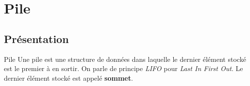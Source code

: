 \def\xxactivite{Cours}

\def\xxauteur{Emilien Durif -- Xavier Pessoles}
\fichefalse \proftrue \tdfalse \courstrue

\def\xxnumchapitre{Chapitre 9 \vspace{.2cm}}

\def\xxchapitre{Piles et files}

\def\xxcompetences{%
\textsl{%
\textbf{Savoirs et compétences :}\\
\begin{itemize}[label=\ding{112},font=\color{bleuxp}] 
\item Piles et files.
\end{itemize}
}}

\def\xxfigures{
}%



\setlength{\columnseprule}{.1pt}

\vspace{2cm}
\pagestyle{fancy}
\thispagestyle{plain}

% 
%





\section{Pile}
\subsection{Présentation}
\begin{defi}{Pile}
Une pile est une structure de données dans laquelle le dernier élément stocké est le premier à en sortir. On parle de principe \textit{LIFO} pour \textit{Last In First Out}. Le dernier élément stocké est appelé \textbf{sommet}.
\end{defi}

